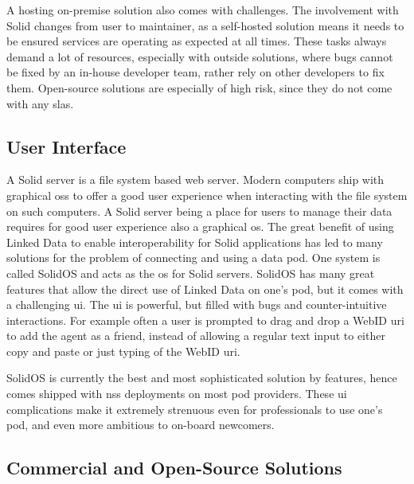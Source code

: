 A hosting on-premise solution also comes with challenges. The involvement with Solid changes from user to maintainer, as a self-hosted solution means it needs to be ensured services are operating as expected at all times. These tasks always demand a lot of resources, especially with outside solutions, where bugs cannot be fixed by an in-house developer team, rather rely on other developers to fix them. Open-source solutions are especially of high risk, since they do not come with any \glspl{sla}.

\subsection{User Interface}

A Solid server is a file system based web server. Modern computers ship with graphical \glspl{os} to offer a good user experience when interacting with the file system on such computers. A Solid server being a place for users to manage their data requires for good user experience also a graphical \gls{os}. The great benefit of using Linked Data to enable interoperability for Solid applications has led to many solutions for the problem of connecting and using a data pod. One system is called SolidOS \cite{solidos} and acts as the \gls{os} for Solid servers. SolidOS has many great features that allow the direct use of Linked Data on one's pod, but it comes with a challenging \gls{ui}. The \gls{ui} is powerful, but filled with bugs and counter-intuitive interactions. For example often a user is prompted to drag and drop a WebID \gls{uri} to add the agent as a friend, instead of allowing a regular text input to either copy and paste or just typing of the WebID \gls{uri}.

SolidOS is currently the best and most sophisticated solution by features, hence comes shipped with \gls{nss} deployments on most pod providers. These \gls{ui} complications make it extremely strenuous even for professionals to use one's pod, and even more ambitious to on-board newcomers.

\subsection{Commercial and Open-Source Solutions}

